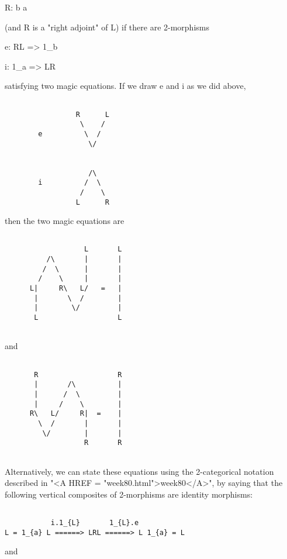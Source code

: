 R: b \to  a

(and R is a "right adjoint" of L) if there are 2-morphisms

e: RL => 1_{b}

i: 1_{a} => LR

satisfying two magic equations.  If we draw e and i as we did above, 


\begin{verbatim}

                 R      L
                  \    /
        e          \  / 
                    \/


                    /\
        i          /  \
                  /    \
                 L      R

\end{verbatim}
    
then the two magic equations are

                  

\begin{verbatim}

                   L       L
          /\       |       |
         /  \      |       |
        /    \     |       |
      L|     R\   L/   =   | 
       |       \  /        |
       |        \/         |
       L                   L


\end{verbatim}
    
and


\begin{verbatim}

       R                   R
       |       /\          |
       |      /  \         |
       |     /    \        |
      R\   L/     R|  =    | 
        \  /       |       |
         \/        |       |
                   R       R


\end{verbatim}
    
Alternatively, we can state these equations using the 2-categorical
notation described in "<A HREF = "week80.html">week80</A>", by saying that the following vertical
composites of 2-morphisms are identity morphisms:


\begin{verbatim}

           i.1_{L}       1_{L}.e
L = 1_{a} L ======> LRL ======> L 1_{a} = L

\end{verbatim}
    
and

